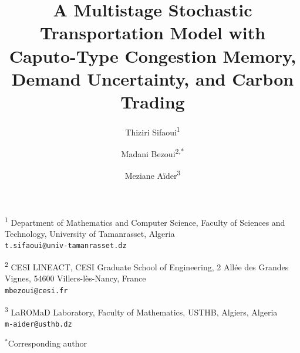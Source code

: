 \documentclass[11pt,a4paper]{article}
\title{A Multistage Stochastic Transportation Model with
Caputo-Type Congestion Memory, Demand Uncertainty, and Carbon Trading}
\author{
Thiziri Sifaoui\textsuperscript{1}
\and
Madani Bezoui\textsuperscript{2,*}
\and
Meziane A{\"i}der\textsuperscript{3}
}
\date{}
\begin{document}
\maketitle

\begin{center}
\small
\textsuperscript{1}
Department of Mathematics and Computer Science,
Faculty of Sciences and Technology,
University of Tamanrasset, Algeria\\
\texttt{t.sifaoui@univ-tamanrasset.dz}

\medskip

\textsuperscript{2}
CESI LINEACT, CESI Graduate School of Engineering,
2 All\'{e}e des Grandes Vignes, 54600 Villers-l\`{e}s-Nancy, France\\
\texttt{mbezoui@cesi.fr}

\medskip

\textsuperscript{3}
LaROMaD Laboratory, Faculty of Mathematics,
USTHB, Algiers, Algeria\\
\texttt{m-aider@usthb.dz}

\medskip

\ensuremath{^{\ast}}Corresponding author
\end{center}

\end{document}
